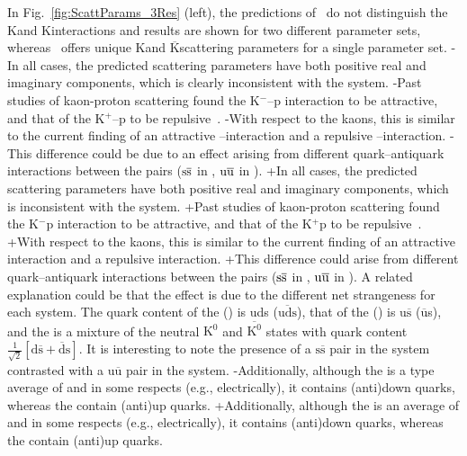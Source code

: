 \begin{table}[htbp]
 In Fig.~\ref{fig:ScattParams_3Res} (left), the predictions of~\cite{Liu:2006xja} do not distinguish the K\Lam and K\ALam interactions and results are shown for two different parameter sets, whereas~\cite{Mai:2009ce} offers unique K\Lam and $\overline{\mathrm{K}}$\Lam scattering parameters for a single parameter set. 
-In all cases, the predicted scattering parameters have both positive real and imaginary components, which is clearly inconsistent with the \LamKchP system.
-Past studies of kaon-proton scattering found the K$^{-}$--p interaction to be attractive, and that of the K$^{+}$--p to be repulsive~\cite{Humphrey:1962zz, Hadjimichef:2002xe, Ikeda:2012au}.
-With respect to the kaons, this is similar to the current finding of an attractive \Lam--\KchM interaction and a repulsive \Lam--\KchP interaction.
-This difference could be due to an effect arising from different quark--antiquark interactions between the pairs ($\rm s\overline{s}$ in \LamKchP, $\rm u\overline{u}$ in \LamKchM).
+In all cases, the predicted scattering parameters have both positive real and imaginary components, which is inconsistent with the \LamKchP system.
+Past studies of kaon-proton scattering found the K$^{-}$p interaction to be attractive, and that of the K$^{+}$p to be repulsive~\cite{Humphrey:1962zz, Hadjimichef:2002xe, Ikeda:2012au}.
+With respect to the kaons, this is similar to the current finding of an attractive \LamKchM interaction and a repulsive \LamKchP interaction.
+This difference could arise from different quark--antiquark interactions between the pairs ($\rm s\overline{s}$ in \LamKchP, $\rm u\overline{u}$ in \LamKchM).
 A related explanation could be that the effect is due to the different net strangeness for each system.
 The quark content of the \Lam (\ALam) is uds ($\overline{\mathrm{uds}}$), that of the \KchP (\KchM) is u$\overline{\mathrm{s}}$ ($\overline{\mathrm{u}}$s), and the \Ks is a mixture of the neutral $\mathrm{K}^{0}$ and $\overline{\mathrm{K}^{0}}$ states with quark content $\frac{1}{\sqrt{2}}\left[\mathrm{d\overline{s} + \overline{d}s}\right]$.
 It is interesting to note the presence of a $\mathrm{s\overline{s}}$ pair in the \LamKchP system contrasted with a $\mathrm{u\overline{u}}$ pair in the \LamKchM system.
-Additionally, although the \Ks is a type average of \KchP and \KchM in some respects (e.g., electrically), it contains (anti)down quarks, whereas the \Kpm contain (anti)up quarks.
+Additionally, although the \Ks is an average of \KchP and \KchM in some respects (e.g., electrically), it contains (anti)down quarks, whereas the \Kpm contain (anti)up quarks.
 

\end{table}
